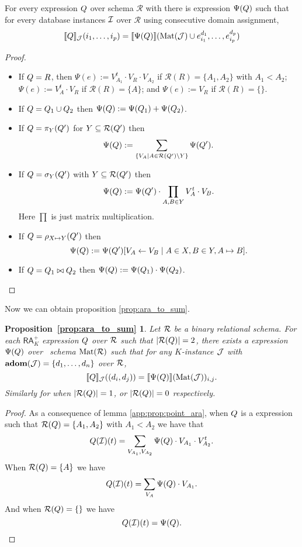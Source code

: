 \begin{lemma}\label{app:prop:point_ara}
For every \rak expression $Q$ over schema $\mathcal{R}$ with there is \langsum expression $\Psi(Q)$ such that for every database instances $\mathcal{I}$ over $\mathcal{R}$ using consecutive domain assignment, 
$$
\llbracket Q \rrbracket_{\mathcal{J}}(i_1,\ldots,i_p)=\llbracket \Psi(Q) \rrbracket(\text{Mat}(\mathcal{J})\cup e_{i_1}^{d_1},\ldots,e_{i_p}^{d_p})
$$
\end{lemma}
\begin{proof}
\begin{itemize}
\item If $Q=R$, then $\Psi(e):=V_{A_1}^t\cdot V_R\cdot V_{A_2}$ if $\mathcal{R}(R)=\{A_1,A_2\}$ with $A_1<A_2$; 
$\Psi(e):=V_A^t\cdot V_R$ if $\mathcal{R}(R)=\{A\}$; and 
$\Psi(e):=V_R$ if $\mathcal{R}(R)=\{\}$.
\item If $Q=Q_1\cup Q_2$ then
$\Psi(Q):=\Psi(Q_1) + \Psi(Q_2)$.
\item If $Q=\pi_{Y}(Q')$ for $Y\subseteq \mathcal{R}(Q')$ then
$$
\Psi(Q):=\sum_{\{V_A\mid A\in \mathcal{R}(Q')\setminus Y\}}\Psi(Q').
 $$
\item If $Q=\sigma_{Y}(Q')$ with $Y\subseteq\mathcal{R}(Q')$ then
$$
 \Psi(Q):=\Psi(Q')\cdot\prod_{A,B\in Y} V_{A}^t\cdot V_{B}.
$$
Here $\prod$ is just matrix multiplication.
\item If $Q=\rho_{X\mapsto Y}(Q')$ then
$$\Psi(Q):=\Psi(Q')[V_A\gets V_B\mid A\in X, B\in Y, A\mapsto B].$$
\item If $Q=Q_1\bowtie Q_2$ then
$\Psi(Q):=\Psi(Q_1)\cdot \Psi(Q_2)$.
\end{itemize}
\end{proof}

Now we can obtain proposition \ref{prop:ara_to_sum}.

\newtheorem*{ARATOSUM}{Proposition~\ref{prop:ara_to_sum}}

\begin{ARATOSUM}
  Let $\mathcal{R}$ be a binary relational schema. For each $\mathsf{RA}_{K}^+$  expression $Q$ over $\mathcal{R}$  such that $|\mathcal{R}(Q)| = 2$, there exists a \langsum  expression $\Psi(Q)$ over \lang \ schema $\text{Mat}(\mathcal{R})$ such that for any $K$-instance $\mathcal{J}$ with $\mathbf{adom}(\mathcal{J}) = \{d_1, \ldots, d_n\}$ over $\mathcal{R}$,
	$$
	\llbracket Q \rrbracket_{\mathcal{J}}((d_i, d_j))=\llbracket \Psi(Q) \rrbracket(\text{Mat}(\mathcal{J}))_{i,j}.
	$$
	Similarly for when $|\mathcal{R}(Q)| = 1$, or $|\mathcal{R}(Q)| = 0$ respectively.
\end{ARATOSUM}
\begin{proof}
As a consequence of lemma \ref{app:prop:point_ara}, when $Q$ is a \rak expression 
such that $\mathcal{R}(Q)=\{A_1,A_2\}$ with $A_1<A_2$ we have that 
$$
Q(\mathcal{I})(t)=
\sum_{V_{A_1},V_{A_2}}\Psi(Q)\cdot V_{A_1}\cdot V_{A_2}^t.
$$
When $\mathcal{R}(Q)=\{A\}$ we have
$$
Q(\mathcal{I})(t)=
\sum_{V_{A}}\Psi(Q)\cdot V_{A_1}.
$$
And when $\mathcal{R}(Q)=\{\}$ we have
$$
Q(\mathcal{I})(t)=\Psi(Q).
$$

\end{proof}
 

